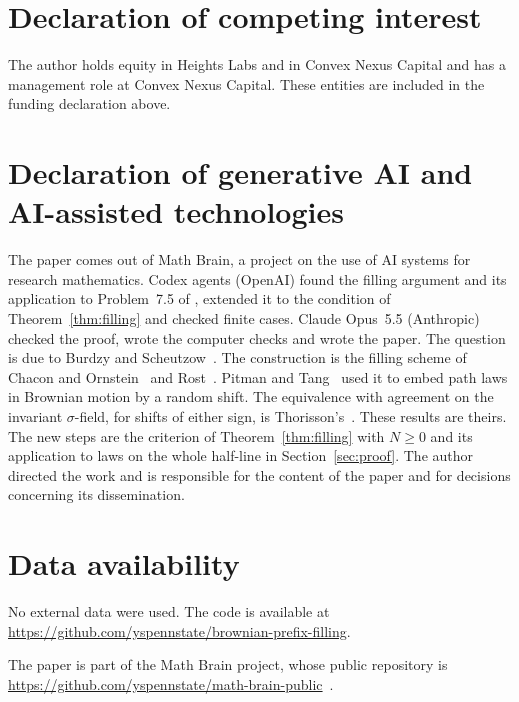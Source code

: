 \documentclass[11pt]{amsart}
\theoremstyle{remark}
\numberwithin{equation}{section}
\begin{document}
\section*{Declaration of competing interest}
The author holds equity in Heights Labs and in Convex Nexus Capital and
has a management role at Convex Nexus Capital. These entities are included
in the funding declaration above.

\section*{Declaration of generative AI and AI-assisted technologies}
The paper comes out of Math Brain, a project on the use of AI systems for research mathematics. Codex agents (OpenAI) found the filling argument and its application to Problem~7.5 of \cite{BS}, extended it to the condition of Theorem~\ref{thm:filling} and checked finite cases. Claude Opus~5.5 (Anthropic) checked the proof, wrote the computer checks and wrote the paper. The question is due to Burdzy and Scheutzow~\cite{BS}. The construction is the filling scheme of Chacon and Ornstein~\cite{CO} and Rost~\cite{Rost71a,Rost71b}. Pitman and Tang~\cite{PT-patterns,PT-slepian} used it to embed path laws in Brownian motion by a random shift. The equivalence with agreement on the invariant $\sigma$-field, for shifts of either sign, is Thorisson's~\cite{Th96}. These results are theirs. The new steps are the criterion of Theorem~\ref{thm:filling} with $N\ge0$ and its application to laws on the whole half-line in Section~\ref{sec:proof}. The author directed the work and is responsible for the content of the paper and for decisions concerning its dissemination.

\section*{Data availability}
No external data were used. The code is available at\\ \url{https://github.com/yspennstate/brownian-prefix-filling}.

The paper is part of the Math Brain project, whose public repository is \url{https://github.com/yspennstate/math-brain-public}~\cite{MathBrainRepo}.
\end{document}
